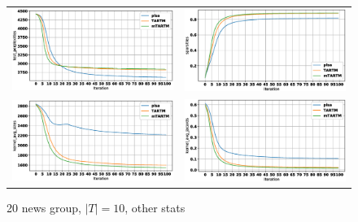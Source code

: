 \documentclass[12pt]{article}
\begin{document}
\begin{figure}[htb]
\centering
  \begin{tabular}{@{}cc@{}}
    \includegraphics[width=.5\linewidth]{pictures/20news_10t_test_perplexities.eps} &
    \includegraphics[width=.5\linewidth]{pictures/20news_10t_sparsities.eps} \\
    \includegraphics[width=.5\linewidth]{pictures/20news_10t_kernel_avg_sizes.eps} &
    \includegraphics[width=.5\linewidth]{pictures/20news_10t_kernel_avg_jacards.eps} \\
  \end{tabular}
  \caption{20 news group, $|T| = 10$, other stats}
\end{figure}
\end{document}
